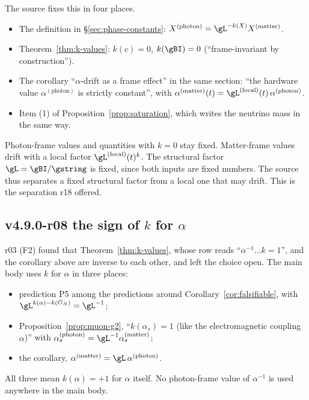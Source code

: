 The source fixes this in four places.
\begin{itemize}[leftmargin=2em]
\item The definition in \S\ref{sec:phase-constants}: \(X^{(\mathrm{photon})}=\gL^{-k(X)}X^{(\mathrm{matter})}\).
\item Theorem~\ref{thm:k-values}: \(k(c)=0\), \(k(\gBI)=0\) (``frame-invariant by construction'').
\item The corollary ``\(\alpha\)-drift as a frame effect'' in the same section: ``the hardware value
\(\alpha^{(\mathrm{photon})}\) is strictly constant'', with \(\alpha^{(\mathrm{matter})}(t)=\gL^{(\mathrm{local})}(t)\,
\alpha^{(\mathrm{photon})}\).
\item Item (1) of Proposition~\ref{prop:saturation}, which writes the neutrino mass in the same way.
\end{itemize}
Photon-frame values and quantities with \(k=0\) stay fixed.  Matter-frame values drift with a local factor
\(\gL^{(\mathrm{local})}(t)^{k}\).  The structural factor \(\gL=\gBI/\gstring\) is fixed, since both inputs are fixed
numbers.  The source thus separates a fixed structural factor from a local one that may drift.  This is the separation
r18 offered.

\subsection*{v4.9.0-r08 the sign of \texorpdfstring{$k$}{k} for \texorpdfstring{$\alpha$}{alpha}}
\label{subsec:v490-r08-alpha-sign}

r03 (F2) found that Theorem~\ref{thm:k-values}, whose row reads ``\(\alpha^{-1}\ldots k=1\)'', and the corollary above are
inverse to each other, and left the choice open.  The main body uses \(k\) for \(\alpha\) in three places:
\begin{itemize}[leftmargin=2em]
\item prediction P5 among the predictions around Corollary~\ref{cor:falsifiable}, with
\(\gL^{k(\alpha)-k(G_N)}=\gL^{-1}\);
\item Proposition~\ref{prop:muon-g2}, ``\(k(\alpha_s)=1\) (like the electromagnetic coupling \(\alpha\))'' with
\(\alpha_s^{(\mathrm{photon})}=\gL^{-1}\alpha_s^{(\mathrm{matter})}\);
\item the corollary, \(\alpha^{(\mathrm{matter})}=\gL\,\alpha^{(\mathrm{photon})}\).
\end{itemize}
All three mean \(k(\alpha)=+1\) for \(\alpha\) itself.  No photon-frame value of \(\alpha^{-1}\) is used anywhere in the main
body.

